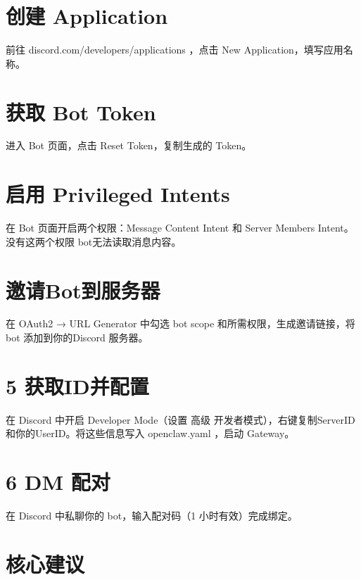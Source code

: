 \documentclass[
  10
]{article}
\begin{document}
\section{创建 Application}\label{ux521bux5efa-application}

前往 discord.com/developers/applications ，点击 New
Application，填写应用名称。

\section{获取 Bot Token}\label{ux83b7ux53d6-bot-token}

进入 Bot 页面，点击 Reset Token，复制生成的 Token。

\section{启用 Privileged Intents}\label{ux542fux7528-privileged-intents}

在 Bot 页面开启两个权限：Message Content Intent 和 Server Members
Intent。没有这两个权限 bot无法读取消息内容。

\section{邀请Bot到服务器}\label{ux9080ux8bf7botux5230ux670dux52a1ux5668}

在 OAuth2 → URL Generator 中勾选 bot scope 和所需权限，生成邀请链接，将
bot 添加到你的Discord 服务器。

\section{5 获取ID并配置}\label{ux83b7ux53d6idux5e76ux914dux7f6e}

在 Discord 中开启 Developer Mode（设置 高级
开发者模式），右键复制ServerID和你的UserID。将这些信息写入 openclaw.yaml
，启动 Gateway。

\section{6 DM 配对}\label{dm-ux914dux5bf9}

在 Discord 中私聊你的 bot，输入配对码（1 小时有效）完成绑定。

\section{核心建议}\label{ux6838ux5fc3ux5efaux8bae-7}
\end{document}
